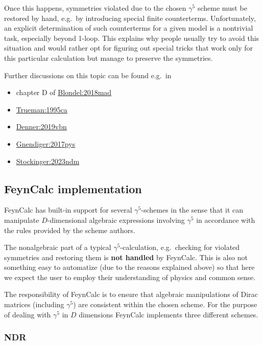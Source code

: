 \documentclass[../FeynCalcManual.tex]{subfiles}
\begin{document}
Once this happens, symmetries violated due to the chosen \(\gamma^5\)
scheme must be restored by hand, e.g.~by introducing special finite
counterterms. Unfortunately, an explicit determination of such
counterterms for a given model is a nontrivial task, especially beyond
1-loop. This explains why people usually try to avoid this situation and
would rather opt for figuring out special tricks that work only for this
particular calculation but manage to preserve the symmetries.

Further discussions on this topic can be found e.g.~in

\begin{itemize}
\tightlist
\item
  chapter D of \href{https://arxiv.org/pdf/1809.01830}{Blondel:2018mad}
\item
  \href{https://arxiv.org/pdf/hep-ph/9504315.pdf}{Trueman:1995ca}
\item
  \href{https://arxiv.org/pdf/1912.06823.pdf}{Denner:2019vbn}
\item
  \href{https://arxiv.org/abs/1705.01827}{Gnendiger:2017pys}
\item
  \href{https://arxiv.org/abs/2312.11291}{Stockinger:2023ndm}
\end{itemize}

\hypertarget{feyncalc-implementation}{%
\subsection{FeynCalc implementation}\label{feyncalc-implementation}}

FeynCalc has built-in support for several \(\gamma^5\)-schemes in the
sense that it can manipulate \(D\)-dimensional algebraic expressions
involving \(\gamma^5\) in accordance with the rules provided by the
scheme authors.

The nonalgebraic part of a typical \(\gamma^5\)-calculation,
e.g.~checking for violated symmetries and restoring them is \textbf{not
handled} by FeynCalc. This is also not something easy to automatize (due
to the reasons explained above) so that here we expect the user to
employ their understanding of physics and common sense.

The responsibility of FeynCalc is to ensure that algebraic manipulations
of Dirac matrices (including \(\gamma^5\)) are consistent within the
chosen scheme. For the purpose of dealing with \(\gamma^5\) in \(D\)
dimensions FeynCalc implements three different schemes.

\hypertarget{ndr}{%
\subsubsection{NDR}\label{ndr}}
\end{document}
